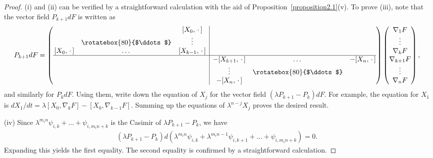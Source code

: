 \documentclass[10pt,a4paper]{amsart}
\numberwithin{equation}{section}
\begin{document}
\begin{proof}
(i) and (ii) can be verif\/ied by a straightforward calculation with the aid of Proposition~\ref{proposition2.1}(v). To prove (iii), note that the vector f\/ield $P_{k+1}dF$ is written as
\begin{gather*}
 P_{k+1}dF = \left(
\begin{array}{@{}ccc|ccc@{}}
 & & [X_0, \, \cdot \,] & & & \\
 & \rotatebox{80}{$\ddots$} & \vdots & & & \\
\,[X_0, \, \cdot \,] & \dots & [X_{k-1}, \, \cdot \,] & & & \\ \hline
 & & & -[X_{k+1}, \, \cdot \,] & \dots & -[X_n, \, \cdot \,] \\
 & & & \vdots & \rotatebox{80}{$\ddots$} & \\
 & & & -[X_n, \, \cdot \,] & & \\
\end{array}
\right) \left(
\begin{array}{@{}c@{}}
\nabla _1F \\
\vdots \\
\nabla _kF \\
\nabla _{k+1} F \\
\vdots \\
\nabla_n F
\end{array}
\right),
\end{gather*}
and similarly for $P_kdF$. Using them, write down the equation of $X_j$ for the vector f\/ield $(\lambda P_{k+1}-P_k)dF$. For example, the equation for $X_1$ is $dX_1/dt = \lambda [X_0, \nabla _kF]-[X_0,\nabla _{k-1}F]$. Summing up the equations of $\lambda ^{n-j}X_j$ proves the desired result.

(iv) Since $\lambda ^{m_in}\psi_{i,k} + \dots +\psi_{i,m_in+k}$ is the Casimir of $\lambda P_{k+1}-P_k$, we have
\begin{gather*}
(\lambda P_{k+1}-P_k) d(\lambda ^{m_in}\psi_{i,k} + \lambda ^{m_in-1}\psi_{i, k+1}+ \dots +\psi_{i,m_in+k})=0.
\end{gather*}
Expanding this yields the f\/irst equality. The second equality is conf\/irmed by a straightforward calculation.


\end{proof}
\end{document}
